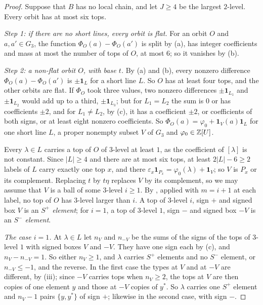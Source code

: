 \begin{proof}
Suppose that $B$ has no local chain, and let $J\ge4$ be the largest
$2$-level. Every orbit has at most six tops.

\emph{Step 1: if there are no short lines, every orbit is flat.} For an orbit
$O$ and $a,a'\in G_{3}$, the function $\Phi_{O}(a)-\Phi_{O}(a')$ is split by
(a), has integer coefficients and mass at most the number of
tops of $O$, at most $6$; so it vanishes by (b).

\emph{Step 2: a non-flat orbit $O$, with base $t$.} By
(a) and (b), every nonzero difference
$\Phi_{O}(a)-\Phi_{O}(a')$ is $\pm\mathbf 1_{L}$ for a short line $L$. So $O$
has at least four tops, and the other orbits are flat. If $\Phi_{O}$ took
three values, two nonzero differences $\pm\mathbf 1_{L_{1}}$ and
$\pm\mathbf 1_{L_{2}}$ would add up to a third, $\pm\mathbf 1_{L_{3}}$; but
for $L_{1}=L_{2}$ the sum is $0$ or has coefficients $\pm2$, and for
$L_{1}\ne L_{2}$, by (c), it has a coefficient $\pm2$,
or coefficients of both signs, or at least eight nonzero coefficients. So
$\Phi_{O}(a)=\varphi_{0}+\mathbf 1_{V}(a)\mathbf 1_{L}$ for one short line
$L$, a proper nonempty subset $V$ of $G_{3}$ and $\varphi_{0}\in\mathbb{Z}[U]$.

Every $\lambda\in L$ carries a top of $O$ of $3$-level at least $1$, as the
coefficient of $[\lambda]$ is not constant. Since $|L|\ge4$ and there are at
most six tops, at least $2|L|-6\ge2$ labels of $L$ carry exactly one top
$x$, and there $\varepsilon_{x}\mathbf 1_{P_{x}}=\varphi_{0}(\lambda)+\mathbf
1_{V}$; so $V$ is $P_{x}$ or its complement. Replacing $t$ by $t\eta$
replaces $V$ by its complement, so we may assume that $V$ is a ball of some
$3$-level $i\ge1$. By , applied with $m=i+1$ at each label,
no top of $O$ has $3$-level larger than $i$. A top of $3$-level $i$, sign $+$
and signed box $V$ is an \emph{$S^{+}$ element}; for $i=1$, a top of
$3$-level $1$, sign $-$ and signed box $-V$ is an \emph{$S^{-}$ element}.

\emph{The case $i=1$.} At $\lambda\in L$ let $n_{V}$ and $n_{-V}$ be the sums
of the signs of the tops of $3$-level $1$ with signed boxes $V$ and $-V$.
They have one sign each by (c), and $n_{V}-n_{-V}=1$. So
either $n_{V}\ge1$, and $\lambda$ carries $S^{+}$ elements and no $S^{-}$
element, or $n_{-V}\le-1$, and the reverse. In the first case the types at
$V$ and at $-V$ are different, by (iii); since $-V$
carries tops when $n_{V}\ge2$, the tops at $V$ are then copies of one
element $y$ and those at $-V$ copies of $y^{*}$. So $\lambda$ carries one
$S^{+}$ element and $n_{V}-1$ pairs $\{y,y^{*}\}$ of sign $+$; likewise in
the second case, with sign $-$.


\end{proof}
